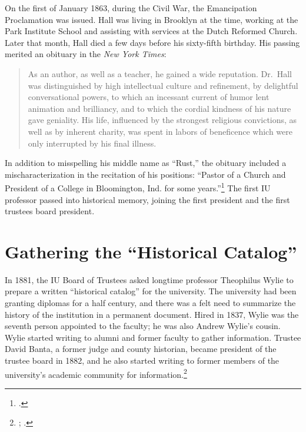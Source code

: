\documentclass[
  american,
  letterpaper,
]{scrreprt}
\begin{document}
On the first of January 1863, during the Civil War, the Emancipation
Proclamation was issued. Hall was living in Brooklyn at the time,
working at the Park Institute School and assisting with services at the
Dutch Reformed Church. Later that month, Hall died a few days before his
sixty-fifth birthday. His passing merited an obituary in the \emph{New
York Times}:

\begin{quote}
As an author, as well as a teacher, he gained a wide reputation.
Dr.~Hall was distinguished by high intellectual culture and refinement,
by delightful conversational powers, to which an incessant current of
humor lent animation and brilliancy, and to which the cordial kindness
of his nature gave geniality. His life, influenced by the strongest
religious convictions, as well as by inherent charity, was spent in
labors of beneficence which were only interrupted by his final illness.
\end{quote}

In addition to misspelling his middle name as ``Rust,'' the obituary
included a mischaracterization in the recitation of his positions:
``Pastor of a Church and President of a College in Bloomington, Ind. for
some years.''\footnote{.} The first IU professor passed into historical memory,
joining the first president and the first trustees board president.

\section{Gathering the ``Historical
Catalog''}\label{gathering-the-historical-catalog}

In 1881, the IU Board of Trustees asked longtime professor Theophilus
Wylie to prepare a written ``historical catalog'' for the university.
The university had been granting diplomas for a half century, and there
was a felt need to summarize the history of the institution in a
permanent document. Hired in 1837, Wylie was the seventh person
appointed to the faculty; he was also Andrew Wylie's cousin. Wylie
started writing to alumni and former faculty to gather information.
Trustee David Banta, a former judge and county historian, became
president of the trustee board in 1882, and he also started writing to
former members of the university's academic community for
information.\footnote{; .}
\end{document}
